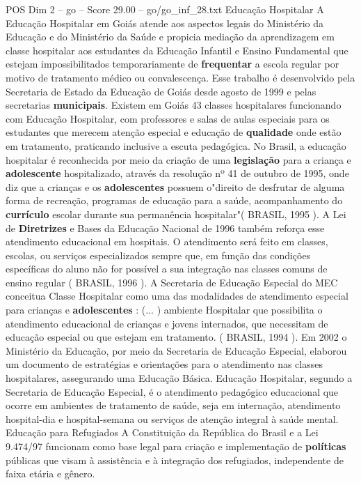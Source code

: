\begin{textsample}{POS Dim 2 – go – Score 29.00 – go/go\_inf\_28.txt}
Educação Hospitalar A Educação Hospitalar em Goiás atende aos aspectos legais do Ministério da Educação e do Ministério da Saúde e propicia mediação da aprendizagem em classe hospitalar aos estudantes da Educação Infantil e Ensino Fundamental que estejam impossibilitados temporariamente de \textbf{frequentar} a escola regular por motivo de tratamento médico ou convalescença.
Esse trabalho é desenvolvido pela Secretaria de Estado da Educação de Goiás desde agosto de 1999 e pelas secretarias \textbf{municipais}.
Existem em Goiás 43 classes hospitalares funcionando com Educação Hospitalar, com professores e salas de aulas especiais para os estudantes que merecem atenção especial e educação de \textbf{qualidade} onde estão em tratamento, praticando inclusive a escuta pedagógica.
No Brasil, a educação hospitalar é reconhecida por meio da criação de uma \textbf{legislação} para a criança e \textbf{adolescente} hospitalizado, através da resolução nº 41 de outubro de 1995, onde diz que a crianças e os \textbf{adolescentes} possuem o"direito de desfrutar de alguma forma de recreação, programas de educação para a saúde, acompanhamento do \textbf{currículo} escolar durante sua permanência hospitalar"( BRASIL, 1995 ).
A Lei de \textbf{Diretrizes} e Bases da Educação Nacional de 1996 também reforça esse atendimento educacional em hospitais.
O atendimento será feito em classes, escolas, ou serviços especializados sempre que, em função das condições específicas do aluno não for possível a sua integração nas classes comuns de ensino regular ( BRASIL, 1996 ).
A Secretaria de Educação Especial do MEC conceitua Classe Hospitalar como uma das modalidades de atendimento especial para crianças e \textbf{adolescentes} : (... ) ambiente Hospitalar que possibilita o atendimento educacional de crianças e jovens internados, que necessitam de educação especial ou que estejam em tratamento. ( BRASIL, 1994 ).
Em 2002 o Ministério da Educação, por meio da Secretaria de Educação Especial, elaborou um documento de estratégias e orientações para o atendimento nas classes hospitalares, assegurando uma Educação Básica.
Educação Hospitalar, segundo a Secretaria de Educação Especial, é o atendimento pedagógico educacional que ocorre em ambientes de tratamento de saúde, seja em internação, atendimento hospital-dia e hospital-semana ou serviços de atenção integral à saúde mental.
Educação para Refugiados A Constituição da República do Brasil e a Lei 9.474/97 funcionam como base legal para criação e implementação de \textbf{políticas} públicas que visam à assistência e à integração dos refugiados, independente de faixa etária e gênero.

\end{textsample}
